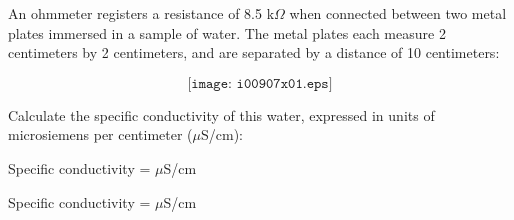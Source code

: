 

An ohmmeter registers a resistance of 8.5 k$\Omega$ when connected between two metal plates immersed in a sample of water.  The metal plates each measure 2 centimeters by 2 centimeters, and are separated by a distance of 10 centimeters:

$$\texttt{[image: i00907x01.eps]}$$

Calculate the specific conductivity of this water, expressed in units of microsiemens per centimeter ($\mu$S/cm):

\vskip 10pt

Specific conductivity = \underbar{\hskip 50pt} $\mu$S/cm







Specific conductivity =  $\mu$S/cm










